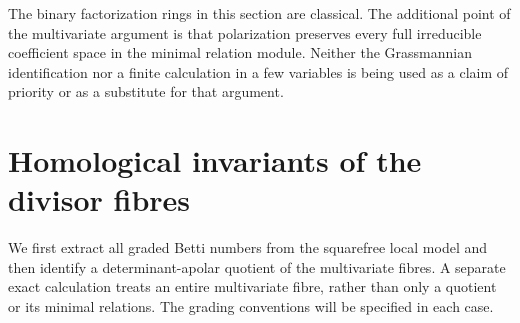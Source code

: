 \documentclass[11pt,reqno]{amsart}
\numberwithin{equation}{section}
\theoremstyle{definition}\newtheorem{definition}[theorem]{Definition}
\theoremstyle{remark}\newtheorem{remark}[theorem]{Remark}
\begin{document}
The binary factorization rings in this section are classical. The
additional point of the multivariate argument is that polarization
preserves every full irreducible coefficient space in the minimal
relation module. Neither the Grassmannian identification nor a finite
calculation in a few variables is being used as a claim of priority
or as a substitute for that argument.


\section{Homological invariants of the divisor fibres}
\label{sec:homological-v154}
We first extract all graded Betti numbers from the squarefree local
model and then identify a determinant-apolar quotient of the
multivariate fibres. A separate exact calculation treats an entire
multivariate fibre, rather than only a quotient or its minimal
relations. The grading conventions will be specified in each case.
\end{document}
